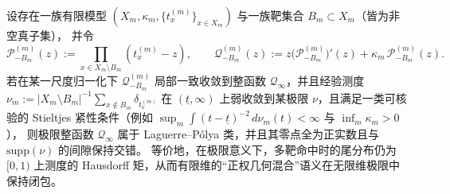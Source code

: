 \begin{conjecture}\label{conj:pom-diagonal-rate-absorbing-laguerre-polya-closure}
设存在一族有限模型 \((X_m,\kappa_m,\{t_x^{(m)}\}_{x\in X_m})\) 与一族靶集合 \(B_m\subset X_m\)（皆为非空真子集），
并令
\[
\mathcal P_{-B_m}^{(m)}(z):=\prod_{x\in X_m\setminus B_m}(t_x^{(m)}-z),
\qquad
\mathcal Q_{-B_m}^{(m)}(z):=z\bigl(\mathcal P_{-B_m}^{(m)}\bigr)'(z)+\kappa_m\,\mathcal P_{-B_m}^{(m)}(z).
\]
若在某一尺度归一化下 \(\mathcal Q_{-B_m}^{(m)}\) 局部一致收敛到整函数 \(\mathcal Q_\infty\)，并且经验测度
\(
\nu_m:=|X_m\setminus B_m|^{-1}\sum_{x\notin B_m}\delta_{t_x^{(m)}}
\)
在 \((\underline t,\infty)\) 上弱收敛到某极限 \(\nu\)，且满足一类可核验的 Stieltjes 紧性条件（例如 \(\sup_m\int (t-\underline t)^{-2}\,d\nu_m(t)<\infty\) 与 \(\inf_m\kappa_m>0\)），
则极限整函数 \(\mathcal Q_\infty\) 属于 Laguerre--Pólya 类，并且其零点全为正实数且与 \(\mathrm{supp}(\nu)\) 的间隙保持交错。
等价地，在极限意义下，多靶命中时的尾分布仍为 \([0,1)\) 上测度的 Hausdorff 矩，从而有限维的“正权几何混合”语义在无限维极限中保持闭包。
\end{conjecture}

\endinput


